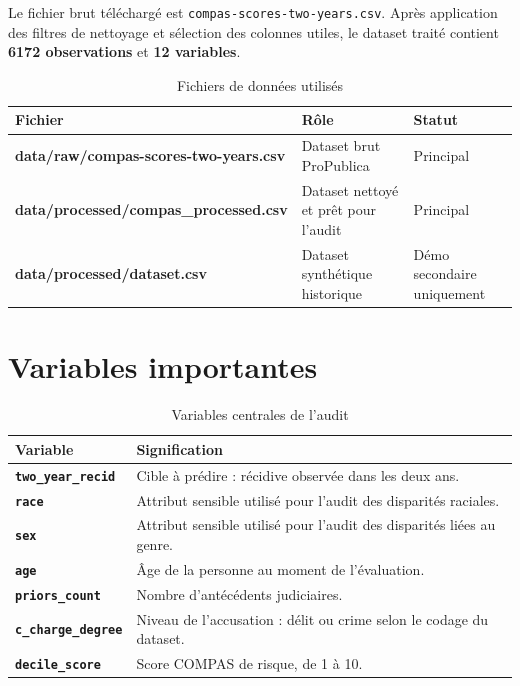 \documentclass[12pt,a4paper]{report}
\begin{document}
Le fichier brut téléchargé est \texttt{compas-scores-two-years.csv}. Après application des filtres de nettoyage et sélection des colonnes utiles, le dataset traité contient \textbf{6172 observations} et \textbf{12 variables}.

\begin{table}[H]
\centering
\caption{Fichiers de données utilisés}
\begin{tabularx}{\textwidth}{>{\ttfamily\small\bfseries}p{} X l}
\toprule
Fichier & Rôle & Statut \\
\midrule
data/raw/compas-scores-two-years.csv & Dataset brut ProPublica & Principal \\
data/processed/compas\_processed.csv & Dataset nettoyé et prêt pour l'audit & Principal \\
data/processed/dataset.csv & Dataset synthétique historique & Démo secondaire uniquement \\
\bottomrule
\end{tabularx}
\end{table}

\section{Variables importantes}

\begin{table}[H]
\centering
\caption{Variables centrales de l'audit}
\begin{tabularx}{\textwidth}{>{\bfseries\color{primarydark}}l X}
\toprule
Variable & Signification \\
\midrule
\texttt{two\_year\_recid} & Cible à prédire : récidive observée dans les deux ans. \\
\texttt{race} & Attribut sensible utilisé pour l'audit des disparités raciales. \\
\texttt{sex} & Attribut sensible utilisé pour l'audit des disparités liées au genre. \\
\texttt{age} & Âge de la personne au moment de l'évaluation. \\
\texttt{priors\_count} & Nombre d'antécédents judiciaires. \\
\texttt{c\_charge\_degree} & Niveau de l'accusation : délit ou crime selon le codage du dataset. \\
\texttt{decile\_score} & Score COMPAS de risque, de 1 à 10. \\
\bottomrule
\end{tabularx}
\end{table}
\end{document}
